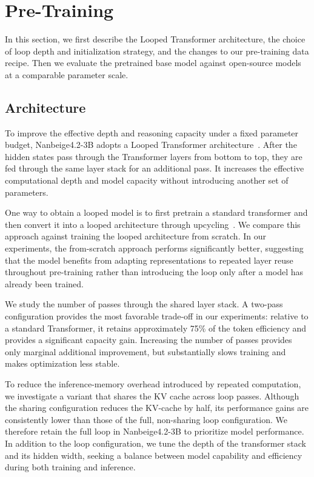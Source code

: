 \section{Pre-Training}

In this section, we first describe the Looped Transformer architecture, the choice of loop depth and initialization strategy, and the changes to our pre-training data recipe. Then we evaluate the pretrained base model against open-source models at a comparable parameter scale.

\subsection{Architecture}

To improve the effective depth and reasoning capacity under a fixed parameter budget, Nanbeige4.2-3B adopts a Looped Transformer architecture~\cite{bae2026mixture}. After the hidden states pass through the Transformer layers from bottom to top, they are fed through the same layer stack for an additional pass. It increases the effective computational depth and model capacity without introducing another set of parameters.

One way to obtain a looped model is to first pretrain a standard transformer and then convert it into a looped architecture through upcycling~\cite{zhu2025scaling, yang2026iquest}. We compare this approach against training the looped architecture from scratch. In our experiments, the from-scratch approach performs significantly better, suggesting that the model benefits from adapting representations to repeated layer reuse throughout pre-training rather than introducing the loop only after a model has already been trained.

We study the number of passes through the shared layer stack. A two-pass configuration provides the most favorable trade-off in our experiments: relative to a standard Transformer, it retains approximately 75\% of the token efficiency and provides a significant capacity gain. Increasing the number of passes provides only marginal additional improvement, but substantially slows training and makes optimization less stable.

To reduce the inference-memory overhead introduced by repeated computation, we investigate a variant that shares the KV cache across loop passes. Although the sharing configuration reduces the KV-cache by half, its performance gains are consistently lower than those of the full, non-sharing loop configuration. We therefore retain the full loop in Nanbeige4.2-3B to prioritize model performance. In addition to the loop configuration, we tune the depth of the transformer stack and its hidden width, seeking a balance between model capability and efficiency during both training and inference.  

